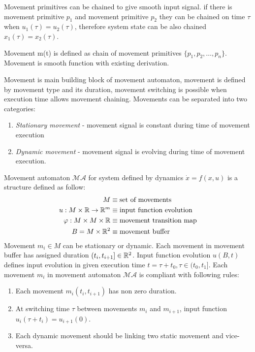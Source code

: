 \noindent Movement primitives can be chained to give smooth input signal. if there is movement primitive $p_1$ and movement primitive $p_2$ they can be chained on time $\tau$ when $u_1(\tau) = u_2(\tau)$, therefore system state can be also chained $x_1(\tau) = x_2(\tau)$.
\begin{definition}{Movement m(t)} is defined as chain of movement primitives $\{p_1,p_2,\dots,p_n\}$. Movement is smooth function with existing derivation. 
\end{definition}
\noindent Movement is main building block of movement automaton, movement is defined by movement type and its duration, movement switching is possible when execution time allows movement chaining. Movements can be separated into two categories:
\begin{enumerate}
    \item \textit{Stationary movement} - movement signal is constant during time of movement execution
    \item \textit{Dynamic movement} - movement signal is evolving during time of movement execution.
\end{enumerate}
\begin{definition} {Movement automaton $\mathscr{MA}$}\label{def:movementAutomaton} for system defined by dynamics $\dot{x} = f(x,u)$ is a structure defined as follow:
\begin{equation}
    \begin{aligned}
    M&\equiv\textnormal{set of movements}\\
    u:M\times\mathbb{R}\to\mathbb{R}^m&\equiv\textnormal{input function evolution}\\
    \varphi:M\times M \times \mathbb{R}&\equiv\textnormal{movement transition map}\\
    B=M\times\mathbb{R}^2&\equiv\textnormal{movement buffer}\\
    \end{aligned}
\end{equation}
Movement $m_i\in M$ can be stationary or dynamic. Each movement in movement buffer has assigned duration $(t_i,t_{i+1}]\in\mathbb{R}^2$. Input function evolution $u(B,t)$ defines input evolution in given execution time $t = \tau+t_0, \tau\in(t_0,t_1]$.
Each movement $m_i$ in movement automaton $\mathscr{MA}$  is compliant with following rules:
\begin{enumerate}
    \item Each movement $m_i(t_{i},t_{i+1})$ has non zero duration.
    \item At switching time $\tau$ between movements $m_i$ and $m_{i+1}$, input function $u_i(\tau + t_i) = u_{i+1}(0)$.
    \item Each dynamic movement should be linking two static movement and vice-versa.
\end{enumerate}
\end{definition}

